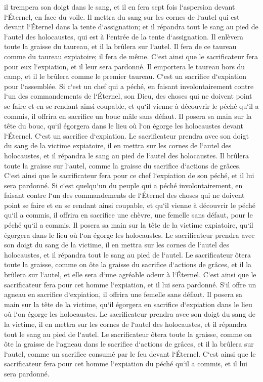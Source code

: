 \verse il trempera son doigt dans le sang, et il en fera sept fois l`aspersion devant l`Éternel, en face du voile. 
\verse Il mettra du sang sur les cornes de l`autel qui est devant l`Éternel dans la tente d`assignation; et il répandra tout le sang au pied de l`autel des holocaustes, qui est à l`entrée de la tente d`assignation. 
\verse Il enlèvera toute la graisse du taureau, et il la brûlera sur l`autel. 
\verse Il fera de ce taureau comme du taureau expiatoire; il fera de même. C`est ainsi que le sacrificateur fera pour eux l`expiation, et il leur sera pardonné. 
\verse Il emportera le taureau hors du camp, et il le brûlera comme le premier taureau. C`est un sacrifice d`expiation pour l`assemblée. 
\verse Si c`est un chef qui a péché, en faisant involontairement contre l`un des commandements de l`Éternel, son Dieu, des choses qui ne doivent point se faire et en se rendant ainsi coupable, 
\verse et qu`il vienne à découvrir le péché qu`il a commis, il offrira en sacrifice un bouc mâle sans défaut. 
\verse Il posera sa main sur la tête du bouc, qu`il égorgera dans le lieu où l`on égorge les holocaustes devant l`Éternel. C`est un sacrifice d`expiation. 
\verse Le sacrificateur prendra avec son doigt du sang de la victime expiatoire, il en mettra sur les cornes de l`autel des holocaustes, et il répandra le sang au pied de l`autel des holocaustes. 
\verse Il brûlera toute la graisse sur l`autel, comme la graisse du sacrifice d`actions de grâces. C`est ainsi que le sacrificateur fera pour ce chef l`expiation de son péché, et il lui sera pardonné. 
\verse Si c`est quelqu`un du peuple qui a péché involontairement, en faisant contre l`un des commandements de l`Éternel des choses qui ne doivent point se faire et en se rendant ainsi coupable, 
\verse et qu`il vienne à découvrir le péché qu`il a commis, il offrira en sacrifice une chèvre, une femelle sans défaut, pour le péché qu`il a commis. 
\verse Il posera sa main sur la tête de la victime expiatoire, qu`il égorgera dans le lieu où l`on égorge les holocaustes. 
\verse Le sacrificateur prendra avec son doigt du sang de la victime, il en mettra sur les cornes de l`autel des holocaustes, et il répandra tout le sang au pied de l`autel. 
\verse Le sacrificateur ôtera toute la graisse, comme on ôte la graisse du sacrifice d`actions de grâces, et il la brûlera sur l`autel, et elle sera d`une agréable odeur à l`Éternel. C`est ainsi que le sacrificateur fera pour cet homme l`expiation, et il lui sera pardonné. 
\verse S`il offre un agneau en sacrifice d`expiation, il offrira une femelle sans défaut. 
\verse Il posera sa main sur la tête de la victime, qu`il égorgera en sacrifice d`expiation dans le lieu où l`on égorge les holocaustes. 
\verse Le sacrificateur prendra avec son doigt du sang de la victime, il en mettra sur les cornes de l`autel des holocaustes, et il répandra tout le sang au pied de l`autel. 
\verse Le sacrificateur ôtera toute la graisse, comme on ôte la graisse de l`agneau dans le sacrifice d`actions de grâces, et il la brûlera sur l`autel, comme un sacrifice consumé par le feu devant l`Éternel. C`est ainsi que le sacrificateur fera pour cet homme l`expiation du péché qu`il a commis, et il lui sera pardonné. 

